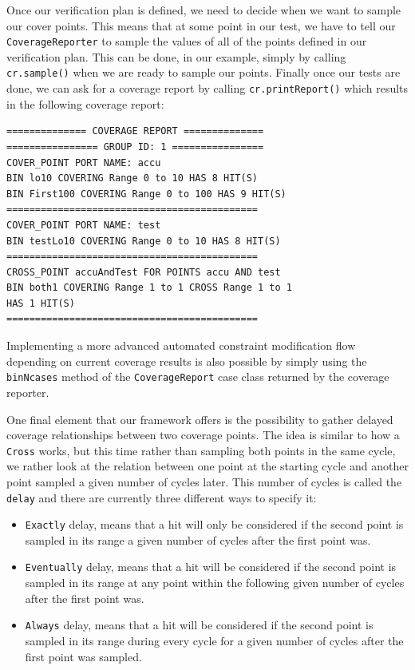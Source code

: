 \documentclass[conference]{IEEEtran}
\begin{document}
Once our verification plan is defined, we need to decide when we want to sample our cover points. This means that at some point in our test, we have to tell our \texttt{CoverageReporter} to sample the values of all of the points defined in our verification plan. This can be done, in our example, simply by calling \texttt{cr.sample()} when we are ready to sample our points. Finally once our tests are done, we can ask for a coverage report by calling \texttt{cr.printReport()} which results in the following coverage report: 
\begin{verbatim}
============== COVERAGE REPORT ==============
================ GROUP ID: 1 ================
COVER_POINT PORT NAME: accu
BIN lo10 COVERING Range 0 to 10 HAS 8 HIT(S)
BIN First100 COVERING Range 0 to 100 HAS 9 HIT(S)
============================================
COVER_POINT PORT NAME: test
BIN testLo10 COVERING Range 0 to 10 HAS 8 HIT(S)
============================================
CROSS_POINT accuAndTest FOR POINTS accu AND test
BIN both1 COVERING Range 1 to 1 CROSS Range 1 to 1 
HAS 1 HIT(S)
============================================
\end{verbatim}
Implementing a more advanced automated constraint modification flow depending on current coverage results is also possible by simply using the \texttt{binNcases} method of the \texttt{CoverageReport} case class returned by the coverage reporter. 

One final element that our framework offers is the possibility to gather delayed coverage relationships between two coverage points. The idea is similar to how a \texttt{Cross} works, but this time rather than sampling both points in the same cycle, we rather look at the relation between one point at the starting cycle and another point sampled a given number of cycles later. This number of cycles is called the \texttt{delay} and there are currently three different ways to specify it:  
\begin{itemize}
  \item \texttt{Exactly} delay, means that a hit will only be considered if the second point is sampled in its range a given number of cycles after the first point was.
  \item \texttt{Eventually} delay, means that a hit will be considered if the second point is sampled in its range at any point within the following given number of cycles after the first point was.  
  \item \texttt{Always} delay, means that a hit will be considered if the second point is sampled in its range during every cycle for a given number of cycles after the first point was sampled.
\end{itemize}
\end{document}
